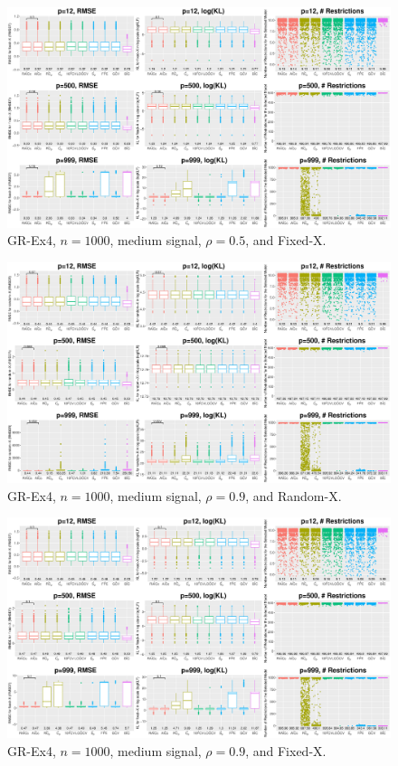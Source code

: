 \begin{figure}[!ht]
\centering
\includegraphics[width=\textwidth]{figures/supplement/fixedx_GR-Ex4_n1000_msnr_rho05.eps}
\caption{GR-Ex4, $n=1000$, medium signal, $\rho=0.5$, and Fixed-X.}
\end{figure}
\clearpage
\begin{figure}[!ht]
\centering
\includegraphics[width=\textwidth]{figures/supplement/randomx_GR-Ex4_n1000_msnr_rho09.eps}
\caption{GR-Ex4, $n=1000$, medium signal, $\rho=0.9$, and Random-X.}
\end{figure}
\begin{figure}[!ht]
\centering
\includegraphics[width=\textwidth]{figures/supplement/fixedx_GR-Ex4_n1000_msnr_rho09.eps}
\caption{GR-Ex4, $n=1000$, medium signal, $\rho=0.9$, and Fixed-X.}
\end{figure}
